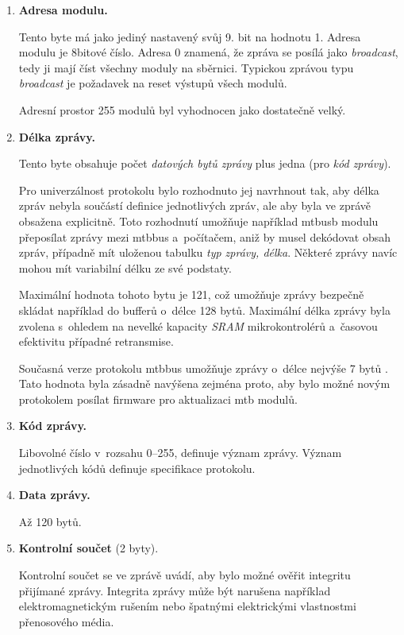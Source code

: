 \begin{enumerate}
\item \textbf{Adresa modulu.}

Tento byte má jako jediný nastavený svůj 9. bit na hodnotu 1.
Adresa modulu je 8bitové číslo. Adresa 0 znamená, že zpráva se posílá
jako \textit{broadcast}, tedy ji mají číst všechny moduly na sběrnici. Typickou
zprávou typu \textit{broadcast} je požadavek na reset výstupů všech modulů.

Adresní prostor 255 modulů byl vyhodnocen jako dostatečně velký.

\item \textbf{Délka zprávy.}

Tento byte obsahuje počet \textit{datových bytů zprávy} plus jedna (pro
\textit{kód zprávy}).

Pro univerzálnost protokolu bylo rozhodnuto jej navrhnout tak, aby délka zpráv
nebyla součástí definice jednotlivých zpráv, ale aby byla ve zprávě obsažena
explicitně. Toto rozhodnutí umožňuje například \gls{mtbusb} modulu
přeposílat zprávy mezi \gls{mtbbus} a~počítačem, aniž by musel dekódovat obsah
zpráv, případně mít uloženou tabulku \textit{typ zprávy, délka}. Některé zprávy
navíc mohou mít variabilní délku ze své podstaty.

Maximální hodnota tohoto bytu je 121, což umožňuje zprávy bezpečně skládat
například do bufferů o~délce 128 bytů. Maximální délka zprávy byla zvolena
s~ohledem na nevelké kapacity \textit{SRAM} mikrokontrolérů a~časovou
efektivitu případné retransmise.

Současná verze protokolu \gls{mtbbus} umožňuje zprávy o~délce nejvýše 7 bytů
\cite{mtbbus-specs}.  Tato hodnota byla zásadně navýšena zejména proto, aby
bylo možné novým protokolem posílat firmware pro aktualizaci \gls{mtb} modulů.

\item \textbf{Kód zprávy.}

Libovolné číslo v~rozsahu 0–255, definuje význam zprávy. Význam jednotlivých
kódů definuje specifikace protokolu.

\item \textbf{Data zprávy.}

Až 120 bytů.

\item \textbf{Kontrolní součet} (2 byty).

Kontrolní součet se ve zprávě uvádí, aby bylo možné ověřit integritu přijímané
zprávy. Integrita zprávy může být narušena například elektromagnetickým rušením
nebo špatnými elektrickými vlastnostmi přenosového média.


\end{enumerate}
